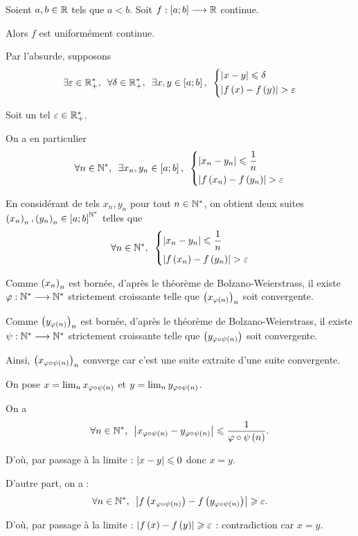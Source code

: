 \begin{theo}
Soient \(a,b\in\mathbb{R}\) tels que \(a<b\). Soit \(f:\left[a;b\right]\longrightarrow\mathbb{R}\) continue.

Alors \(f\) est uniformément continue.
\end{theo}

\begin{dem}
Par l'absurde, supposons \[\quantifs{\exists\epsilon\in\Rps;\forall\delta\in\Rps;\exists x,y\in\intervii{a}{b}}\begin{dcases}\abs{x-y}\leq\delta \\ \abs{f\paren{x}-f\paren{y}}>\epsilon\end{dcases}\]

Soit un tel \(\varepsilon\in\mathbb{R}_+^*\).

On a en particulier \[\quantifs{\forall n\in\Ns;\exists x_n,y_n\in\intervii{a}{b}}\begin{dcases}\abs{x_n-y_n}\leq\dfrac{1}{n} \\ \abs{f\paren{x_n}-f\paren{y_n}}>\epsilon\end{dcases}\]

En considérant de tels \(x_n,y_n\) pour tout \(n\in\mathbb{N}^*\), on obtient deux suites \(\left(x_n\right)_n,\left(y_n\right)_n\in\left[a;b\right]^{\mathbb{N}^*}\) telles que \[\quantifs{\forall n\in\Ns}\begin{dcases}\abs{x_n-y_n}\leq\dfrac{1}{n} \\ \abs{f\paren{x_n}-f\paren{y_n}}>\epsilon\end{dcases}\]

Comme \(\left(x_n\right)_n\) est bornée, d'après le théorème de Bolzano-Weierstrass, il existe \(\varphi:\mathbb{N}^*\longrightarrow\mathbb{N}^*\) strictement croissante telle que \(\left(x_{\varphi\left(n\right)}\right)_n\) soit convergente.

Comme \(\left(y_{\varphi\left(n\right)}\right)_n\) est bornée, d'après le théorème de Bolzano-Weierstrass, il existe \(\psi:\mathbb{N}^*\longrightarrow\mathbb{N}^*\) strictement croissante telle que \(\left(y_{\varphi\circ\psi\left(n\right)}\right)\) soit convergente.

Ainsi, \(\left(x_{\varphi\circ\psi\left(n\right)}\right)_n\) converge car c'est une suite extraite d'une suite convergente.

On pose \(x=\lim_nx_{\varphi\circ\psi\left(n\right)}\) et \(y=\lim_ny_{\varphi\circ\psi\left(n\right)}\).

On a \[\quantifs{\forall n\in\Ns}\abs{x_{\phi\rond\psi\paren{n}}-y_{\phi\rond\psi\paren{n}}}\leq\dfrac{1}{\phi\rond\psi\paren{n}}.\]

D'où, par passage à la limite : \(\left\lvert x-y\right\rvert\leqslant0\) donc \(x=y\).

D'autre part, on a : \[\quantifs{\forall n\in\Ns}\abs{f\paren{x_{\phi\rond\psi\paren{n}}}-f\paren{y_{\phi\rond\psi\paren{n}}}}\geq\epsilon.\]

D'où, par passage à la limite : \(\left\lvert f\left(x\right)-f\left(y\right)\right\rvert\geqslant\varepsilon\) : contradiction car \(x=y\).
\end{dem}

